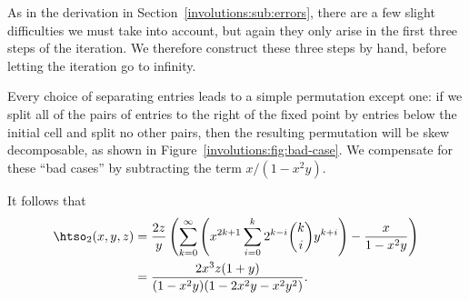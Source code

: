 \documentclass[12pt,twoside]{memoir}
\begin{document}
      As in the derivation in Section~\ref{involutions:sub:errors}, there are a
      few slight difficulties we must take into account, but again they only
      arise in the first three steps of the iteration. We therefore construct
      these three steps by hand, before letting the iteration go to infinity. 

      Every choice of separating entries leads to a simple permutation except
      one: if we split all of the pairs of entries to the right of the fixed point by
      entries below the initial cell and split no other pairs, then the resulting
      permutation will be skew decomposable, as shown in
      Figure~\ref{involutions:fig:bad-case}. We compensate for these ``bad cases'' by
      subtracting the term $x/(1 - x^2y)$. 



      It follows that
      $$ \begin{aligned}
        \htso_2(x,y,z)
        &=
        \frac{2z}{y}\left(\sum_{k=0}^\infty \left(x^{2k+1}\sum_{i=0}^k
            2^{k-i}{k\choose i}y^{k+i}\right) - \frac{x}{1-x^2y}\right)\\ 
        &=
        \frac{2x^3z(1+y)}{(1-x^2y)(1-2x^2y-x^2y^2)}.
      \end{aligned} $$
\end{document}
